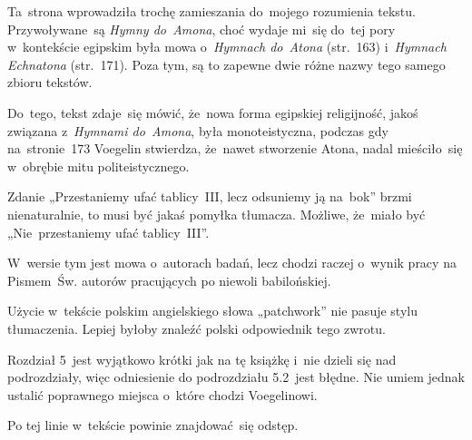 \documentclass[a4paper,11pt]{article}
\numberwithin{equation}{section}
\begin{document}
\VerSpaceFour





\noindent
{} Ta~strona wprowadziła trochę zamieszania do~mojego
rozumienia tekstu. Przywoływane~są \textit{Hymny do~Amona}, choć wydaje
mi~się do~tej pory w~kontekście egipskim była mowa o~\textit{Hymnach
  do~Atona} (str.~163) i~\textit{Hymnach Echnatona} (str.~171). Poza
tym, są to zapewne dwie różne nazwy tego samego zbioru tekstów.

Do~tego, tekst zdaje~się mówić, że~nowa forma egipskiej religijność,
jakoś związana z~\textit{Hymnami do~Amona}, była monoteistyczna, podczas
gdy na~stronie~173 Voegelin stwierdza, że~nawet stworzenie Atona,
nadal mieściło~się w~obrębie mitu politeistycznego.

\VerSpaceFour





\noindent
{} Zdanie „Przestaniemy ufać tablicy~III, lecz
odsuniemy ją na~bok” brzmi nienaturalnie, to musi być jakaś pomyłka
tłumacza. Możliwe, że~miało być „Nie~przestaniemy ufać tablicy~III”.

\VerSpaceFour





\noindent
{} W~wersie tym jest mowa o~autorach badań, lecz
chodzi raczej o~wynik pracy na Pismem~Św. autorów pracujących po
niewoli babilońskiej.

\VerSpaceFour





\noindent
{} Użycie w~tekście polskim angielskiego słowa
„patchwork” nie pasuje stylu tłumaczenia. Lepiej byłoby znaleźć
polski odpowiednik tego zwrotu.

\VerSpaceFour





\noindent
{} Rozdział 5~jest wyjątkowo krótki jak na tę
książkę i~nie dzieli się nad podrozdziały, więc odniesienie do
podrozdziału 5.2~jest błędne. Nie umiem jednak ustalić poprawnego
miejsca o~które chodzi Voegelinowi.

\VerSpaceFour





\noindent
{} Po tej linie w~tekście powinie znajdować~się odstęp.
\end{document}
